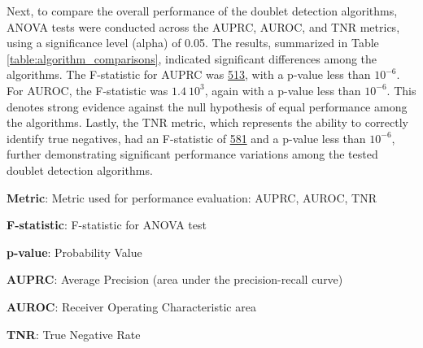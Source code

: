 \documentclass[11pt]{article}
\begin{document}
Next, to compare the overall performance of the doublet detection algorithms, ANOVA tests were conducted across the AUPRC, AUROC, and TNR metrics, using a significance level (alpha) of 0.05. The results, summarized in Table \ref{table:algorithm_comparisons}, indicated significant differences among the algorithms. The F-statistic for AUPRC was \hyperlink{B0a}{513}, with a p-value less than \hyperlink{B0b}{$10^{-6}$}. For AUROC, the F-statistic was \hyperlink{B1a}{$1.4\ 10^{3}$}, again with a p-value less than \hyperlink{B1b}{$10^{-6}$}. This denotes strong evidence against the null hypothesis of equal performance among the algorithms. Lastly, the TNR metric, which represents the ability to correctly identify true negatives, had an F-statistic of \hyperlink{B2a}{581} and a p-value less than \hyperlink{B2b}{$10^{-6}$}, further demonstrating significant performance variations among the tested doublet detection algorithms.

\begin{table}[h]
\caption{\protect\hyperlink{file-table-1-pkl}{Comparisons of doublet detection algorithms performance}}
\label{table:algorithm_comparisons}
\begin{threeparttable}
\renewcommand{\TPTminimum}{\linewidth}
\begin{tablenotes}
\footnotesize
\item \textbf{Metric}: Metric used for performance evaluation: AUPRC, AUROC, TNR
\item \textbf{F-statistic}: F-statistic for ANOVA test
\item \textbf{p-value}: Probability Value
\item \textbf{AUPRC}: Average Precision (area under the precision-recall curve)
\item \textbf{AUROC}: Receiver Operating Characteristic area
\item \textbf{TNR}: True Negative Rate
\end{tablenotes}
\end{threeparttable}
\end{table}
\end{document}
